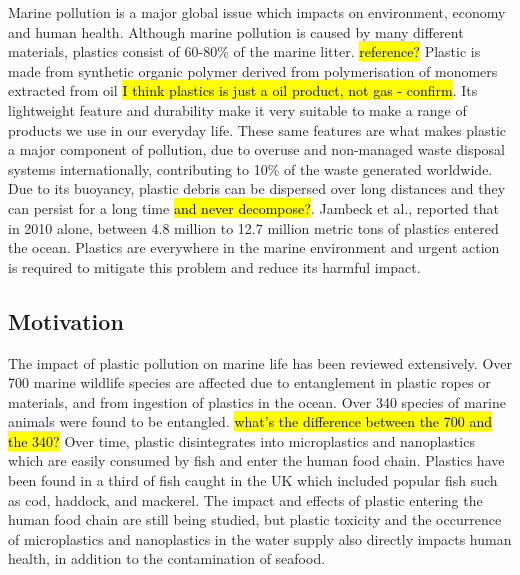 \documentclass[10pt]{article}\usepackage[]{graphicx}\usepackage[]{color}
\begin{document}
Marine pollution is a major global issue which impacts on environment, economy and human health. Although marine pollution is caused by many different materials, plastics consist of 60-80\% of the marine litter. \hl{reference?} Plastic is made from synthetic organic polymer derived from polymerisation of monomers extracted from oil \hl{I think plastics is just a oil product, not gas - confirm}.\cite{DERRAIK2002} \cite{RIOS2007} Its lightweight feature and durability make it very suitable to make a range of products we use in our everyday life.\cite{BARNES2009} \cite{SIVAN2011} These same features are what makes plastic a major component of pollution, due to overuse and non-managed waste disposal systems internationally, contributing to 10\% of the waste generated worldwide.\cite{BARNES2009} Due to its buoyancy, plastic debris can be dispersed over long distances and they can persist for a long time \hl{and never decompose?}. Jambeck et al.,\cite{JAMBECK2015} reported that in 2010 alone, between 4.8 million to 12.7 million metric tons of plastics entered the ocean. Plastics are everywhere in the marine environment and urgent action is required to mitigate this problem and reduce its harmful impact.\cite{RIOS2007} \cite{ROCHMAN2015}


\subsection{Motivation}\label{mot}

The impact of plastic pollution on marine life has been reviewed extensively. \cite{GALL2015} \cite{KUHN2015} \cite{RYAN2015} \cite{WILLIAMS2019} Over 700 marine wildlife species are affected due to entanglement in plastic ropes or materials, and from ingestion of plastics in the ocean.\cite{GALL2015} Over 340 species of marine animals were found to be entangled. \cite{KUHN2015} \hl{what's the difference between the 700 and the 340?} Over time, plastic disintegrates into microplastics and nanoplastics which are easily consumed by fish and enter the human food chain. Plastics have been found in a third of fish caught in the UK which included popular fish such as cod, haddock, and mackerel. \cite{LUSHER2013} The impact and effects of plastic entering the human food chain are still being studied, but plastic toxicity and the occurrence of microplastics and nanoplastics in the water supply also directly impacts human health, in addition to the contamination of seafood.\cite{ROCHMAN2015} \cite{MARKIC2020} \\
\end{document}
